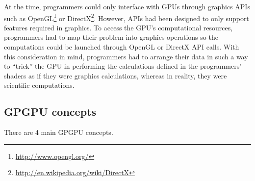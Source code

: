 \documentclass[12pt, a4paper]{report}
\begin{document}
At the time, programmers could only interface with GPUs through graphics APIs
such as OpenGL\footnote{\url{http://www.opengl.org/}} or DirectX\footnote{\url{http://en.wikipedia.org/wiki/DirectX}}.
However, APIs had been designed to only support features required in graphics.
To access the GPU's computational resources, programmers had to map their
problem into graphics operations so the computations could be launched through
OpenGL or DirectX API calls.
With this consideration in mind, programmers had to arrange their data in such a
way to ``trick'' the GPU in performing the calculations defined in the
programmers' shaders as if they were graphics calculations, whereas in reality,
they were scientific computations.

\subsection{GPGPU concepts}
There are 4 main GPGPU concepts.
\end{document}
